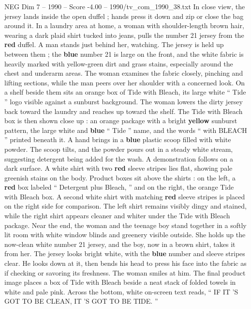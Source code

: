 \begin{textsample}{NEG Dim 7 – 1990 – Score -4.00 – 1990/tv\_com\_1990\_38.txt}
In close view, the jersey lands inside the open duffel ; hands press it down and zip or close the bag around it.
In a laundry area at home, a woman with shoulder-length brown hair, wearing a dark plaid shirt tucked into jeans, pulls the number 21 jersey from the \textbf{red} duffel.
A man stands just behind her, watching.
The jersey is held up between them ; the \textbf{blue} number 21 is large on the front, and the white fabric is heavily marked with yellow-green dirt and grass stains, especially around the chest and underarm areas.
The woman examines the fabric closely, pinching and lifting sections, while the man peers over her shoulder with a concerned look.
On a shelf beside them sits an orange box of Tide with Bleach, its large white “ Tide ” logo visible against a sunburst background.
The woman lowers the dirty jersey back toward the laundry and reaches up toward the shelf.
The Tide with Bleach box is then shown close up : an orange package with a bright \textbf{yellow} sunburst pattern, the large white and \textbf{blue} “ Tide ” name, and the words “ with BLEACH ” printed beneath it.
A hand brings in a \textbf{blue} plastic scoop filled with white powder.
The scoop tilts, and the powder pours out in a steady white stream, suggesting detergent being added for the wash.
A demonstration follows on a dark surface.
A white shirt with two \textbf{red} sleeve stripes lies flat, showing pale greenish stains on the body.
Product boxes sit above the shirts : on the left, a \textbf{red} box labeled “ Detergent plus Bleach, ” and on the right, the orange Tide with Bleach box.
A second white shirt with matching \textbf{red} sleeve stripes is placed on the right side for comparison.
The left shirt remains visibly dingy and stained, while the right shirt appears cleaner and whiter under the Tide with Bleach package.
Near the end, the woman and the teenage boy stand together in a softly lit room with white window blinds and greenery visible outside.
She holds up the now-clean white number 21 jersey, and the boy, now in a brown shirt, takes it from her.
The jersey looks bright white, with the \textbf{blue} number and sleeve stripes clear.
He looks down at it, then bends his head to press his face into the fabric as if checking or savoring its freshness.
The woman smiles at him.
The final product image places a box of Tide with Bleach beside a neat stack of folded towels in white and pale pink.
Across the bottom, white on-screen text reads, “ IF IT ’S GOT TO BE CLEAN, IT ’S GOT TO BE TIDE. ”

\end{textsample}
